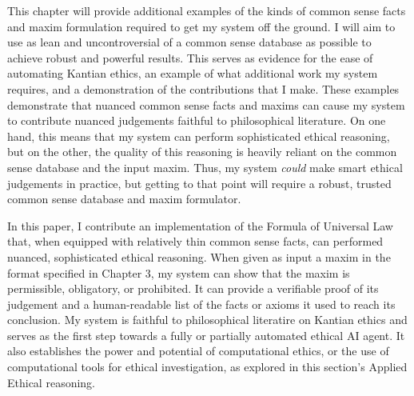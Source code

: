 \begin{isabellebody}
\begin{isamarkuptext}
This chapter will provide additional examples of the kinds of common sense facts and maxim formulation required to get my system
off the ground. I will aim to use as lean and uncontroversial of a common sense database as possible
to achieve robust and powerful results. This serves as evidence for the ease of automating
Kantian ethics, an example of what additional work my system requires, and a demonstration of the contributions
that I make. These examples demonstrate that nuanced common sense facts and maxims can cause my system to contribute 
nuanced judgements faithful to philosophical literature. On one hand, this means that my system can perform
sophisticated ethical reasoning, but on the other, the quality of this reasoning is heavily reliant on 
the common sense database and the input maxim. Thus, my system \emph{could} make smart ethical judgements 
in practice, but getting to that point will require a robust, trusted common sense database and maxim
formulator.

In this paper, I contribute an implementation of the Formula of Universal Law that, when equipped with 
relatively thin common sense facts, can performed nuanced, sophisticated ethical reasoning. When given 
as input a maxim in the format specified in Chapter 3, my system can show that the maxim is permissible, 
obligatory, or prohibited. It can provide a verifiable proof of its judgement and a human-readable list
of the facts or axioms it used to reach its conclusion. My system is faithful to philosophical literatire
on Kantian ethics and serves as the first step towards a fully or partially automated ethical AI agent. 
It also establishes the power and potential of computational ethics, or the use of computational tools
for ethical investigation, as explored in this section's Applied Ethical reasoning. 


\end{isamarkuptext}
\end{isabellebody}
